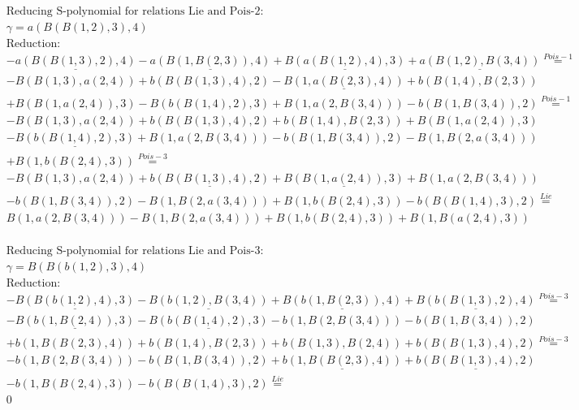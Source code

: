 \documentclass[11pt]{amsart}
\begin{document}
\begin{align*} 
& \text{Reducing S-polynomial for relations Lie and Pois-2:} \\ 
& \gamma = a(B(B(1,2),3),4) \\ 
& \text{Reduction}: \\& - \underline{a(B(B(1,3),2),4)} - \underline{a(B(1,B(2,3)),4)} + \underline{B(a(B(1,2),4),3)} + \underline{a(B(1,2),B(3,4))} \stackrel{ Pois-1 }{=}  \\ 
& - B(B(1,3),a(2,4)) + b(B(B(1,3),4),2) - \underline{B(1,a(B(2,3),4))} + b(B(1,4),B(2,3))\\ 
 &  + B(B(1,a(2,4)),3) - B(b(B(1,4),2),3) + B(1,a(2,B(3,4))) - b(B(1,B(3,4)),2) \stackrel{ Pois-1 }{=}  \\ 
& - B(B(1,3),a(2,4)) + b(B(B(1,3),4),2) + b(B(1,4),B(2,3)) + B(B(1,a(2,4)),3)\\ 
 &  - \underline{B(b(B(1,4),2),3)} + B(1,a(2,B(3,4))) - b(B(1,B(3,4)),2) - B(1,B(2,a(3,4)))\\ 
 &  + B(1,b(B(2,4),3)) \stackrel{ Pois-3 }{=}  \\ 
& - B(B(1,3),a(2,4)) + \underline{b(B(B(1,3),4),2)} + \underline{B(B(1,a(2,4)),3)} + B(1,a(2,B(3,4)))\\ 
 &  - b(B(1,B(3,4)),2) - B(1,B(2,a(3,4))) + B(1,b(B(2,4),3)) - b(B(B(1,4),3),2) \stackrel{ Lie }{=}  \\ 
&B(1,a(2,B(3,4))) - B(1,B(2,a(3,4))) + B(1,b(B(2,4),3)) + B(1,B(a(2,4),3))\\ 
\end{align*} 
 
\begin{align*} 
& \text{Reducing S-polynomial for relations Lie and Pois-3:} \\ 
& \gamma = B(B(b(1,2),3),4) \\ 
& \text{Reduction}: \\& - \underline{B(B(b(1,2),4),3)} - \underline{B(b(1,2),B(3,4))} + \underline{B(b(1,B(2,3)),4)} + \underline{B(b(B(1,3),2),4)} \stackrel{ Pois-3 }{=}  \\ 
& - \underline{B(b(1,B(2,4)),3)} - \underline{B(b(B(1,4),2),3)} - b(1,B(2,B(3,4))) - b(B(1,B(3,4)),2)\\ 
 &  + b(1,B(B(2,3),4)) + b(B(1,4),B(2,3)) + b(B(1,3),B(2,4)) + b(B(B(1,3),4),2) \stackrel{ Pois-3 }{=}  \\ 
& - b(1,B(2,B(3,4))) - b(B(1,B(3,4)),2) + \underline{b(1,B(B(2,3),4))} + \underline{b(B(B(1,3),4),2)}\\ 
 &  - b(1,B(B(2,4),3)) - b(B(B(1,4),3),2) \stackrel{ Lie }{=}  \\ 
&0\\ 
\end{align*} 
 
\end{document}
